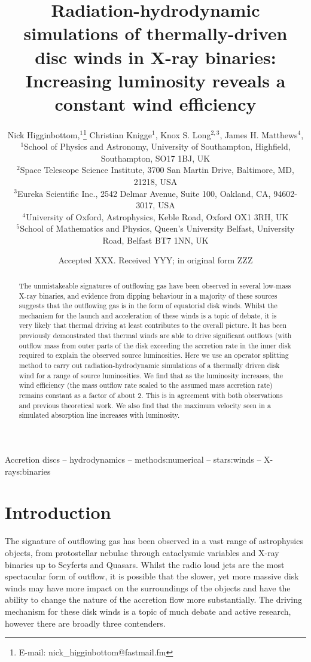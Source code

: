 \documentclass[a4paper,fleqn,usenatbib]{mnras}
\title[Increasing luminosity]{Radiation-hydrodynamic simulations of thermally-driven disc winds in X-ray binaries: Increasing
luminosity reveals a constant wind efficiency}
\author[N. Higginbottom et. al]
{Nick Higginbottom,$^{1}$\thanks{E-mail: nick\_higginbottom@fastmail.fm}
Christian Knigge$^{1}$, Knox S. Long$^{2,3}$, 
James H. Matthews$^{4}$, \newauthor{Stuart A. Sim$^{5}$ and
Henrietta A. Hewitt$^{5}$.}
\\
$^{1}$School of Physics and Astronomy, University of Southampton, Highfield, Southampton, SO17 1BJ, UK\\
$^{2}$Space Telescope Science Institute, 3700 San Martin Drive, Baltimore, MD, 21218, USA\\
$^{3}$Eureka Scientific Inc., 2542 Delmar Avenue, Suite 100, Oakland, CA, 94602-3017, USA\\
$^{4}$University of Oxford, Astrophysics, Keble Road, Oxford OX1 3RH, UK\\
$^{5}$School of Mathematics and Physics, Queen's University Belfast, University Road, Belfast 
BT7 1NN, UK\\
}
\date{Accepted XXX. Received YYY; in original form ZZZ}
\begin{document}
\label{firstpage}
\pagerange{\pageref{firstpage}--\pageref{lastpage}}
\maketitle

\begin{abstract}
The unmistakeable signatures of outflowing gas have been observed in several low-mass X-ray binaries, and 
evidence from dipping behaviour in a majority of these sources suggests that the outflowing gas is in the form of equatorial disk winds. Whilst the mechanism for the launch and acceleration of these winds is a topic of debate, it is very likely
that thermal driving at least contributes to the overall picture. 
It has been previously demonstrated that thermal winds are able to drive significant outflows (with outflow mass
from outer parts of the disk exceeding the accretion rate in the inner disk required to explain the observed source
luminosities. 
Here we use an operator splitting method to carry out radiation-hydrodynamic simulations of a thermally driven disk wind for a range of source luminosities. We find that as the luminosity increases, the wind efficiency (the mass outflow
rate scaled to the assumed mass accretion rate) remains constant as a factor of about 2. This is in agreement
with both observations and previous theoretical work. We also find that the maximum velocity seen in a simulated 
absorption line increases with luminosity. 



\end{abstract}

\begin{keywords}
Accretion discs -- hydrodynamics -- methods:numerical -- stars:winds -- X-rays:binaries
\end{keywords}



\section{Introduction}
The signature of outflowing gas has been observed in a vast range of astrophysics objects, from protostellar
nebulae through cataclysmic variables and X-ray binaries up to Seyferts and Quasars. Whilst the 
radio loud jets are the most spectacular form of outflow, it is possible that the slower, yet more massive disk
winds may have more impact on the surroundings of the objects and have the ability to change the nature
of the accretion flow more substantially.
The driving mechanism for these disk winds is a topic of much debate and active research, however there are broadly
three contenders. 
\end{document}
